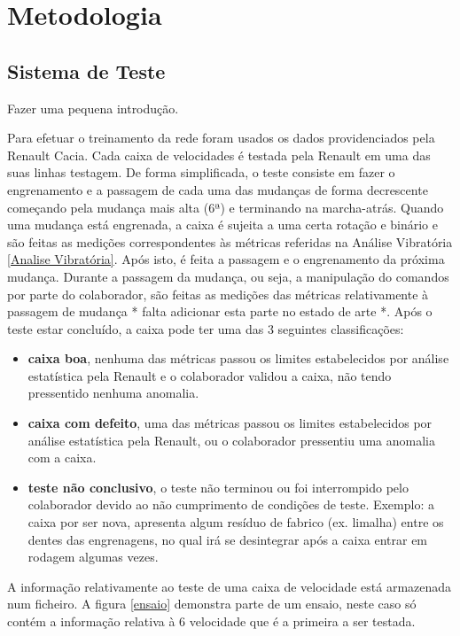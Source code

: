 

\chapter{Metodologia}
\label{chapter:metodolia}




\section{Sistema de Teste}


Fazer uma pequena introdução.

Para efetuar o treinamento da rede foram usados os dados providenciados pela Renault Cacia.
	Cada caixa de velocidades é testada pela Renault em uma das suas linhas testagem. De forma simplificada, o teste consiste em fazer o engrenamento e a passagem de cada uma das mudanças de forma decrescente começando pela mudança mais alta (6ª) e terminando na marcha-atrás. Quando uma mudança está engrenada, a caixa é sujeita a uma certa rotação e binário e são feitas as medições correspondentes às métricas referidas na Análise Vibratória \ref{Analise Vibratória}. Após isto, é feita a passagem e o engrenamento da próxima mudança. Durante a passagem da mudança, ou seja, a manipulação do comandos por parte do colaborador, são feitas as medições das métricas relativamente à passagem de mudança * falta adicionar esta parte no estado de arte *. Após o teste estar concluído, a caixa pode ter uma das 3 seguintes classificações: 
\begin{itemize}
\item \textbf{caixa  boa}, nenhuma das métricas passou os limites estabelecidos por análise estatística pela Renault e o colaborador validou a caixa, não tendo pressentido nenhuma anomalia.
\item \textbf{caixa com defeito}, uma das métricas passou os limites estabelecidos por análise estatística pela Renault, ou o colaborador pressentiu uma anomalia com a caixa.
\item \textbf{teste não conclusivo}, o teste não terminou ou foi interrompido pelo colaborador devido ao não cumprimento de condições de teste. Exemplo: a caixa por ser nova, apresenta algum resíduo de fabrico (ex. limalha) entre os dentes das engrenagens, no qual irá se desintegrar após a caixa entrar em rodagem algumas vezes. 
\end{itemize}

A informação relativamente ao teste de uma caixa de velocidade está armazenada num ficheiro. A figura \ref{ensaio} demonstra parte de um ensaio, neste caso só contém a informação relativa à 6 velocidade que é a primeira a ser testada.


